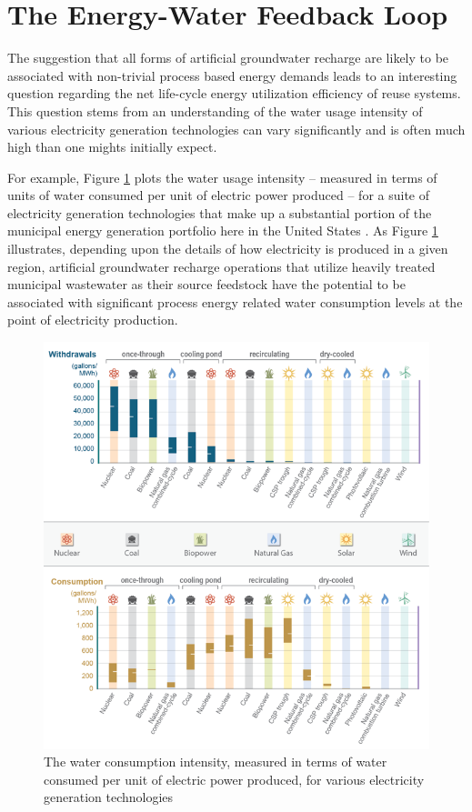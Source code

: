 \section{The Energy-Water Feedback Loop}
 
The suggestion that all forms of artificial groundwater recharge are likely to be associated with non-trivial process based energy demands leads to an interesting question regarding the net life-cycle energy utilization efficiency of reuse systems. This question stems from an understanding of the water usage intensity of various electricity generation technologies can vary significantly and is often much high than one mights initially expect. 
 
For example, Figure \ref{fig:water-consumption-intensity} plots the water usage intensity -- measured in terms of units of water consumed per unit of electric power produced -- for a suite of electricity generation technologies that make up a substantial portion of the municipal energy generation portfolio here in the United States \cite{Averyt2013}. As Figure \ref{fig:water-consumption-intensity} illustrates, depending upon the details of how electricity is produced in a given region, artificial groundwater recharge operations that utilize heavily treated municipal wastewater as their source feedstock have the potential to be associated with significant process energy related water consumption levels at the point of electricity production.
 
       \begin{figure}[!h]
           \centering
           \includegraphics[width=5.5in]{figures/water_consumption_for_energy.png}
           \caption[Water Intensity of Energy Production]{The water consumption intensity, measured in terms of water consumed per unit of electric power produced, for various electricity generation technologies \cite{Averyt2013}}
           \label{fig:water-consumption-intensity}
       \end{figure}
        

